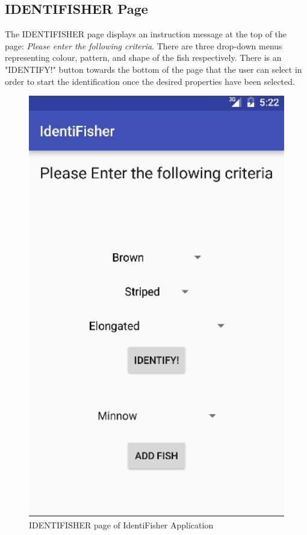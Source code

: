 \documentclass{article}
\begin{document}
\subsection{IDENTIFISHER Page}
The IDENTIFISHER page displays an instruction message at the top of the page: \textit{Please enter the following criteria}. There are three
drop-down menus representing colour, pattern, and shape of the fish respectively. There is an "IDENTIFY!" button towards the bottom of the page that the user can select in order to start the identification once the desired properties have been selected.\\

\begin{figure}[H]
	\includegraphics[scale=0.30]{IdentiFisher.png}
	\caption{IDENTIFISHER page of IdentiFisher Application}
\end{figure}
\end{document}
